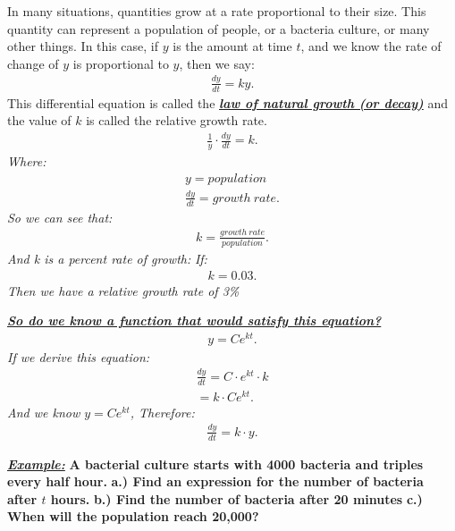 \documentclass{report}
\begin{document}
    \bigbreak \noindent
    In many situations, quantities grow at a rate proportional to their size.
    This quantity can represent a population of people, or a bacteria culture,
    or many other things. In this case, if $y$ is the amount at time  $t$, and we 
    know the rate of change of $y$ is proportional to $y$, then we say:
     \begin{align*}
      \frac{dy}{dt} = ky
    .\end{align*}
    \bigbreak \noindent 
    This differential equation is called the \textbf{\textit{\underline{law of natural growth (or decay)}}}
    and the value of $k$ is called the relative growth rate.
    \begin{align*}
      \frac{1}{y} \cdot \frac{dy}{dt} = k 
    .\end{align*}
    \textit{Where:}
    \begin{align*}
      y = population \\
      \frac{dy}{dt} = growth\ rate
    .\end{align*}
    \bigbreak \noindent 
    \textit{So we can see that:}
    \begin{align*}
        k = \frac{growth\ rate}{population} 
    .\end{align*}
    \bigbreak \noindent 
    \textit{And k is a percent rate of growth:}
    \bigbreak \noindent 
    \textit{If:}
    \begin{align*}
      k = 0.03
    .\end{align*}
    \bigbreak \noindent 
    \textit{Then we have a relative growth rate of 3\%}
    
    \bigbreak \noindent 
    \textbf{\textit{\underline{So do we know a function that would satisfy this equation?}}}
    \begin{align*}
      y = Ce^{kt}
    .\end{align*}
    \bigbreak \noindent 
    \textit{If we derive this equation:}
    \begin{align*}
      \frac{dy}{dt} = C \cdot e^{kt} \cdot  k \\ 
      = k \cdot Ce^{kt}
    .\end{align*}
    \bigbreak \noindent 
    \textit{And we know $y = Ce^{kt}$, Therefore:}
    \begin{align*}
      \frac{dy}{dt} = k \cdot y
    .\end{align*}
    \bigbreak \noindent 

    \pagebreak 
    \begin{mdframed}
      \textbf{\textit{\underline{Example:}}} \textbf{A bacterial culture starts with 4000 bacteria and triples every half hour.}
      \bigbreak \noindent 
      \textbf{a.) Find an expression for the number of bacteria after $t$ hours.}
      \smallbreak \noindent
      \textbf{b.) Find the number of bacteria after 20 minutes}
      \smallbreak \noindent
      \textbf{c.) When will the population reach 20,000?}
    \end{mdframed}
\end{document}
